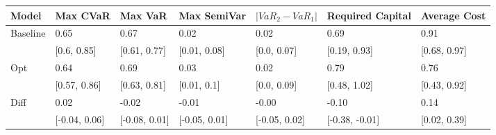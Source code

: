 \begin{tabular}{lllllll}
\toprule
   Model &      Max CVaR &       Max VaR &   Max SemiVar & $|VaR_2 - VaR_1|$ & Required Capital & Average Cost \\
\midrule
Baseline &          0.65 &          0.67 &          0.02 &              0.02 &             0.69 &         0.91 \\
         &   [0.6, 0.85] &  [0.61, 0.77] &  [0.01, 0.08] &       [0.0, 0.07] &     [0.19, 0.93] & [0.68, 0.97] \\
     Opt &          0.64 &          0.69 &          0.03 &              0.02 &             0.79 &         0.76 \\
         &  [0.57, 0.86] &  [0.63, 0.81] &   [0.01, 0.1] &       [0.0, 0.09] &     [0.48, 1.02] & [0.43, 0.92] \\
    Diff &          0.02 &         -0.02 &         -0.01 &             -0.00 &            -0.10 &         0.14 \\
         & [-0.04, 0.06] & [-0.08, 0.01] & [-0.05, 0.01] &     [-0.05, 0.02] &   [-0.38, -0.01] & [0.02, 0.39] \\
\bottomrule
\end{tabular}
